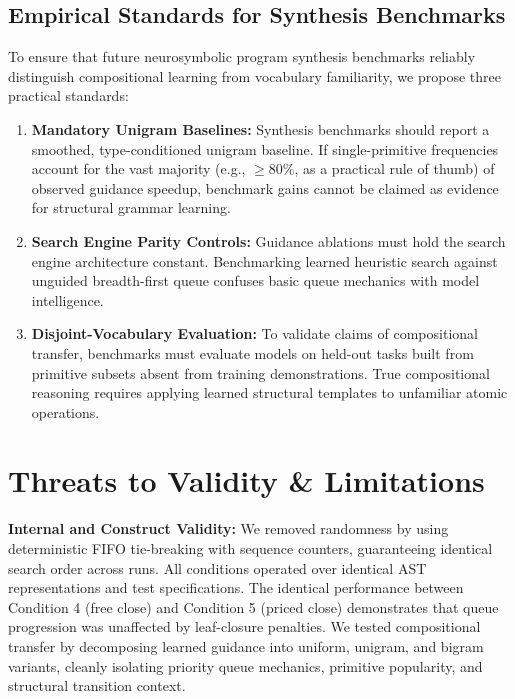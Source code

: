 \documentclass[10pt,twocolumn]{article}
\begin{document}
\subsection{Empirical Standards for Synthesis Benchmarks}
To ensure that future neurosymbolic program synthesis benchmarks reliably distinguish compositional learning from vocabulary familiarity, we propose three practical standards:

\begin{enumerate}[leftmargin=1.2em, itemsep=0.5pt, parsep=0pt]
    \item \textbf{Mandatory Unigram Baselines:} Synthesis benchmarks should report a smoothed, type-conditioned unigram baseline. If single-primitive frequencies account for the vast majority (e.g., $\ge 80\%$, as a practical rule of thumb) of observed guidance speedup, benchmark gains cannot be claimed as evidence for structural grammar learning.
    \item \textbf{Search Engine Parity Controls:} Guidance ablations must hold the search engine architecture constant. Benchmarking learned heuristic search against unguided breadth-first queue confuses basic queue mechanics with model intelligence.
    \item \textbf{Disjoint-Vocabulary Evaluation:} To validate claims of compositional transfer, benchmarks must evaluate models on held-out tasks built from primitive subsets absent from training demonstrations. True compositional reasoning requires applying learned structural templates to unfamiliar atomic operations.
\end{enumerate}

\section{Threats to Validity \& Limitations}

\textbf{Internal and Construct Validity:} We removed randomness by using deterministic FIFO tie-breaking with sequence counters, guaranteeing identical search order across runs. All conditions operated over identical AST representations and test specifications. The identical performance between Condition 4 (free close) and Condition 5 (priced close) demonstrates that queue progression was unaffected by leaf-closure penalties. We tested compositional transfer by decomposing learned guidance into uniform, unigram, and bigram variants, cleanly isolating priority queue mechanics, primitive popularity, and structural transition context.
\end{document}
